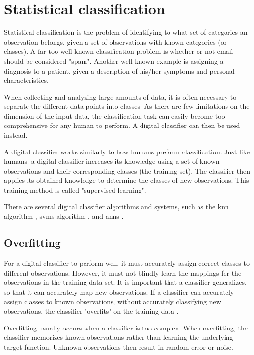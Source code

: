 \section{Statistical classification}

Statistical classification is the problem of identifying to what set of categories an observation belongs, given a set of observations with known categories (or classes). A far too well-known classification problem is whether or not email should be considered "spam". Another well-known example is assigning a diagnosis to a patient, given a description of his/her symptoms and personal characteristics.

When collecting and analyzing large amounts of data, it is often necessary to separate the different data points into classes. As there are few limitations on the dimension of the input data, the classification task can easily become too comprehensive for any human to perform. A digital classifier can then be used instead.

A digital classifier works similarly to how humans preform classification. Just like humans, a digital classifier increases its knowledge using a set of known observations and their corresponding classes (the training set). The classifier then applies its obtained knowledge to determine the classes of new observations. This training method is called "supervised learning".

There are several digital classifier algorithms and systems, such as the \gls{knn} algorithm \citep{bib:peterson-2009}, \glspl{svm} algorithm \citep{bib:noble-2006}, and \glspl{ann} \citep{bib:yegnanarayana-2009}.


\subsection{Overfitting}

For a digital classifier to perform well, it must accurately assign correct classes to different observations. However, it must not blindly learn the mappings for the observations in the training data set. It is important that a classifier generalizes, so that it can accurately map new observations. If a classifier can accurately assign classes to known observations, without accurately classifying new observations, the classifier "overfits" on the training data \citep{bib:hawkins2004problem}.

Overfitting usually occurs when a classifier is too complex. When overfitting, the classifier memorizes known observations rather than learning the underlying target function. Unknown observations then result in random error or noise.